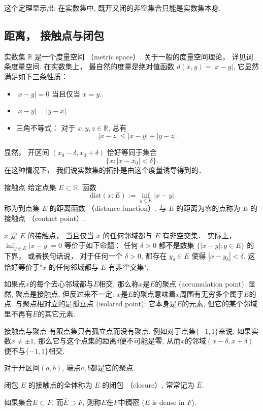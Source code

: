 这个定理显示出: 在实数集中, 既开又闭的非空集合只能是实数集本身.

\subsection{距离， 接触点与闭包}
实数集 $\mathbb{R}$ 是一个度量空间 （metric space）. 关于一般的度量空间理论， 详见词条度量空间. 在实数集上， 最自然的度量是绝对值函数 $d(x,y)=|x-y|$, 它显然满足如下三条性质：

\begin{itemize}
\item $|x-y|=0$ 当且仅当 $x=y$.
\item $|x-y|=|y-x|$.
\item 三角不等式： 对于 $x,y,z\in\mathbb{R}$, 总有
$$
|x-z|\leq|x-y|+|y-z|.
$$
\end{itemize}

显然， 开区间 $(x_0-\delta,x_0+\delta)$ 恰好等同于集合
$$
\{x:|x-x_0|<\delta\}.
$$
在这种情况下， 我们说实数集的拓扑是由这个度量诱导得到的．

\begin{definition}{接触点}
给定点集 $E\subset\mathbb{R}$, 函数
$$
\text{dist}(x;E):=\inf_{y\in E}|x-y|
$$
称为到点集 $E$ 的距离函数 （distance function）. 与 $E$ 的距离为零的点称为 $E$ 的接触点 （contact point）. 
\end{definition}
$x$ 是 $E$ 的接触点， 当且仅当 $x$ 的任何邻域都与 $E$ 有非空交集． 实际上， $\inf_{y\in E}|x-y|=0$ 等价于如下命题： 任何 $\delta>0$ 都不是数集 $\{|x-y|:y\in E\}$ 的下界， 或者换句话说， 对于任何一个 $\delta>0$, 都存在 $y_\delta\in E$ 使得 $|x-y_\delta|<\delta$. 这恰好等价于"$x$ 的任何邻域都与 $E$ 有非空交集".

如果点$x$的每个去心邻域都与$E$相交, 那么称$x$是$E$的聚点 (accumulation point). 显然, 聚点是接触点, 但反过来不一定: $x$是$E$的聚点意味着$x$周围有无穷多个属于$E$的点. 与聚点相对立的是孤立点 (isolated point): 它本身是$E$的元素, 但它的某个邻域里不再有$E$的其它元素.

\begin{example}{接触点与聚点}
有限点集只有孤立点而没有聚点. 例如对于点集$\{-1,1\}$来说, 如果实数$x\neq\pm1$, 那么它与这个点集的距离$\delta$便不可能是零, 从而$x$的邻域$(x-\delta,x+\delta)$便不与$\{-1,1\}$相交.

对于开区间$(a,b)$, 端点$a,b$都是它的聚点.
\end{example}

\begin{definition}{闭包}
$E$ 的接触点的全体称为 $E$ 的闭包 （closure）, 常常记为 $\bar E$.

如果集合$E\subset F$, 而$\bar E\supset F$, 则称$E$在$F$中稠密 ($E$ is dense in $F$).
\end{definition}

